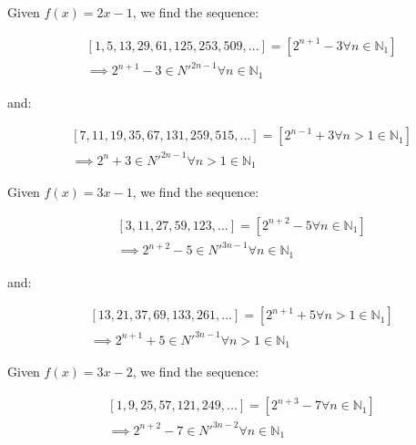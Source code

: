 \documentclass{article}
\begin{document}
\noindent
Given \begin{math}f(x)=2x-1\end{math}, we find the sequence:

\begin{displaymath}\begin{aligned}
& [1, 5, 13, 29, 61, 125, 253, 509, ...] = [2^{n+1}-3 \forall n \in \mathbb{N}_{1}] \\
& \implies 2^{n+1}-3 \in N'^{2n-1} \forall n \in \mathbb{N}_{1}
\end{aligned}\end{displaymath}

\noindent
and:

\begin{displaymath}\begin{aligned}
& [7, 11, 19, 35, 67, 131, 259, 515, ...] = [2^{n-1}+3 \forall n>1 \in \mathbb{N}_{1}] \\
& \implies 2^n+3 \in N'^{2n-1} \forall n>1 \in \mathbb{N}_{1}
\end{aligned}\end{displaymath}

\noindent
Given \begin{math}f(x)=3x-1\end{math}, we find the sequence:

\begin{displaymath}\begin{aligned}
& [3, 11, 27, 59, 123, ...] = [2^{n+2}-5 \forall n \in \mathbb{N}_{1}] \\
& \implies 2^{n+2}-5 \in N'^{3n-1} \forall n \in \mathbb{N}_{1}
\end{aligned}\end{displaymath}

\noindent
and:

\begin{displaymath}\begin{aligned}
& [13, 21, 37, 69, 133, 261, ...] = [2^{n+1}+5 \forall n>1 \in \mathbb{N}_{1}] \\
& \implies 2^{n+1}+5 \in N'^{3n-1} \forall n>1 \in \mathbb{N}_{1}
\end{aligned}\end{displaymath}

\noindent
Given \begin{math}f(x)=3x-2\end{math}, we find the sequence:

\begin{displaymath}\begin{aligned}
& [1, 9, 25, 57, 121, 249, ...] = [2^{n+3}-7 \forall n \in \mathbb{N}_{1}] \\
& \implies 2^{n+2}-7 \in N'^{3n-2} \forall n \in \mathbb{N}_{1}
\end{aligned}\end{displaymath}
\end{document}
